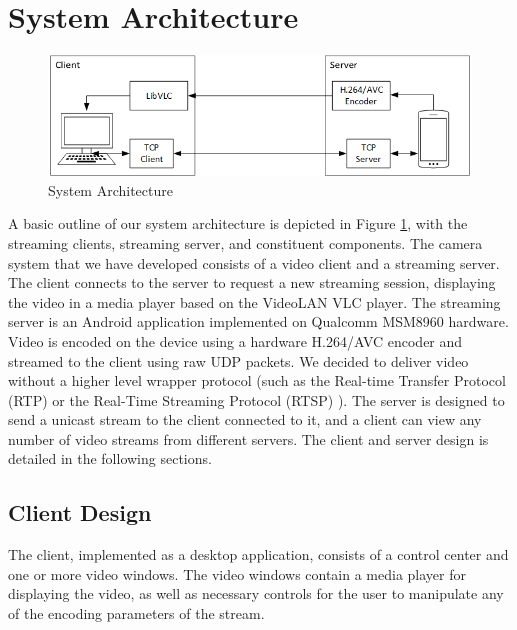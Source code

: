 \documentclass[preprint, 12pt]{elsarticle}
\begin{document}

\section{System Architecture}
\label{sec:Architecture}
\begin{figure}[h]
\centering
\includegraphics[width=0.8\linewidth]{SystemArchitecture.png}
\caption{System Architecture}
\label{fig:SystemArchitecture}
\end{figure}

A basic outline of our system architecture is depicted in Figure \ref{fig:SystemArchitecture}, with the streaming clients, streaming server, and constituent components. The camera system that we have developed consists of a video client and a streaming server. The client connects to the server to request a new streaming session, displaying the video in a media player based on the VideoLAN VLC player. The streaming server is an Android application implemented on Qualcomm MSM8960 hardware. Video is encoded on the device using a hardware H.264/AVC encoder and streamed to the client using raw UDP packets. We decided to deliver video without a higher level wrapper protocol (such as the Real-time Transfer Protocol (RTP) \cite{RTP} or the Real-Time Streaming Protocol (RTSP) \cite{RTSP}). The server is designed to send a unicast stream to the client connected to it, and a client can view any number of video streams from different servers. The client and server design is detailed in the following sections.

\subsection{Client Design}

The client, implemented as a desktop application, consists of a control center and one or more video windows. The video windows contain a media player for displaying the video, as well as necessary controls for the user to manipulate any of the encoding parameters of the stream. 
\end{document}
